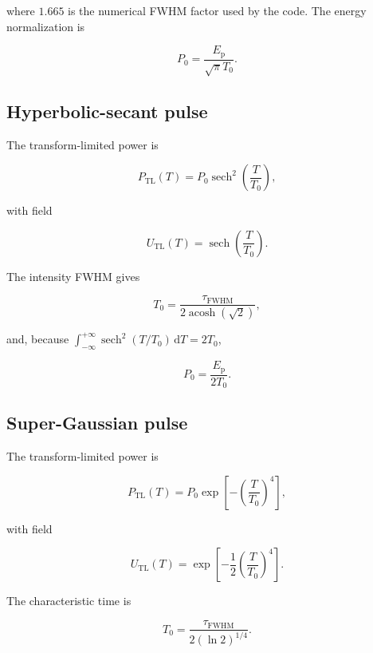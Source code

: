 \documentclass[11pt,a4paper]{article}
\newcommand{\FWHM}{\mathrm{FWHM}}
\newcommand{\TL}{\mathrm{TL}}
\newcommand{\dd}{\mathrm{d}}
\newcommand{\sech}{\operatorname{sech}}
\begin{document}
where $1.665$ is the numerical FWHM factor used by the code. The energy
normalization is

\begin{equation}
\boxed{
P_0=\frac{E_{\mathrm p}}{\sqrt{\pi}T_0}.
}
\end{equation}

\subsection{Hyperbolic-secant pulse}

The transform-limited power is

\begin{equation}
P_{\TL}(T)=P_0\sech^2\left(\frac{T}{T_0}\right),
\end{equation}

with field

\begin{equation}
U_{\TL}(T)=\sech\left(\frac{T}{T_0}\right).
\end{equation}

The intensity FWHM gives

\begin{equation}
\boxed{
T_0=
\frac{\tau_{\FWHM}}
{2\operatorname{acosh}(\sqrt{2})},
}
\end{equation}

and, because $\int_{-\infty}^{+\infty}\sech^2(T/T_0)\,\dd T=2T_0$,

\begin{equation}
\boxed{
P_0=\frac{E_{\mathrm p}}{2T_0}.
}
\end{equation}

\subsection{Super-Gaussian pulse}

The transform-limited power is

\begin{equation}
P_{\TL}(T)
=P_0\exp\left[-\left(\frac{T}{T_0}\right)^4\right],
\end{equation}

with field

\begin{equation}
U_{\TL}(T)
=\exp\left[-\frac{1}{2}\left(\frac{T}{T_0}\right)^4\right].
\end{equation}

The characteristic time is

\begin{equation}
\boxed{
T_0=\frac{\tau_{\FWHM}}{2(\ln2)^{1/4}}.
}
\end{equation}
\end{document}
